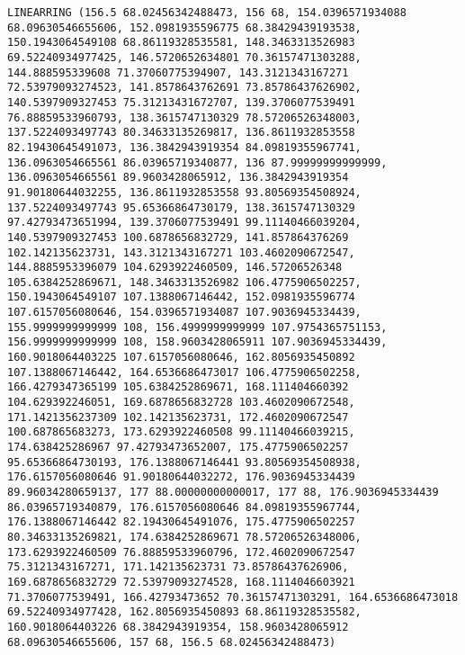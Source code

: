 \documentclass{article}
\begin{document}
\begin{Verbatim}[commandchars=\\\{\}]
LINEARRING (156.5 68.02456342488473, 156 68, 154.0396571934088 68.09630546655606, 152.0981935596775 68.38429439193538, 150.1943064549108 68.86119328535581, 148.3463313526983 69.52240934977425, 146.5720652634801 70.36157471303288, 144.888595339608 71.37060775394907, 143.3121343167271 72.53979093274523, 141.8578643762691 73.85786437626902, 140.5397909327453 75.31213431672707, 139.3706077539491 76.88859533960793, 138.3615747130329 78.57206526348003, 137.5224093497743 80.34633135269817, 136.8611932853558 82.19430645491073, 136.3842943919354 84.09819355967741, 136.0963054665561 86.03965719340877, 136 87.99999999999999, 136.0963054665561 89.9603428065912, 136.3842943919354 91.90180644032255, 136.8611932853558 93.80569354508924, 137.5224093497743 95.65366864730179, 138.3615747130329 97.42793473651994, 139.3706077539491 99.11140466039204, 140.5397909327453 100.6878656832729, 141.857864376269 102.142135623731, 143.3121343167271 103.4602090672547, 144.8885953396079 104.6293922460509, 146.57206526348 105.6384252869671, 148.3463313526982 106.4775906502257, 150.1943064549107 107.1388067146442, 152.0981935596774 107.6157056080646, 154.0396571934087 107.9036945334439, 155.9999999999999 108, 156.4999999999999 107.9754365751153, 156.9999999999999 108, 158.9603428065911 107.9036945334439, 160.9018064403225 107.6157056080646, 162.8056935450892 107.1388067146442, 164.6536686473017 106.4775906502258, 166.4279347365199 105.6384252869671, 168.111404660392 104.629392246051, 169.6878656832728 103.4602090672548, 171.1421356237309 102.142135623731, 172.4602090672547 100.687865683273, 173.6293922460508 99.11140466039215, 174.638425286967 97.42793473652007, 175.4775906502257 95.65366864730193, 176.1388067146441 93.80569354508938, 176.6157056080646 91.90180644032272, 176.9036945334439 89.96034280659137, 177 88.00000000000017, 177 88, 176.9036945334439 86.03965719340879, 176.6157056080646 84.09819355967744, 176.1388067146442 82.19430645491076, 175.4775906502257 80.34633135269821, 174.6384252869671 78.57206526348006, 173.6293922460509 76.88859533960796, 172.4602090672547 75.3121343167271, 171.142135623731 73.85786437626906, 169.6878656832729 72.53979093274528, 168.1114046603921 71.3706077539491, 166.42793473652 70.36157471303291, 164.6536686473018 69.52240934977428, 162.8056935450893 68.86119328535582, 160.9018064403226 68.3842943919354, 158.9603428065912 68.09630546655606, 157 68, 156.5 68.02456342488473)

\end{Verbatim}
\end{document}
